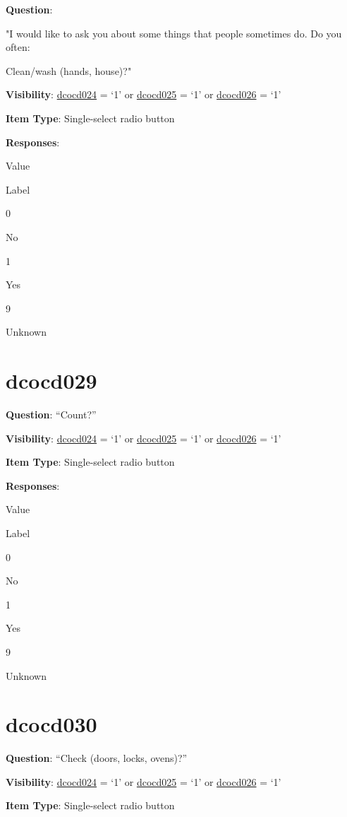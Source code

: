 \documentclass[]{book}
\begin{document}
\textbf{Question}:

"I would like to ask you about some things that people sometimes do. Do you often:

Clean/wash (hands, house)?"

\textbf{Visibility}: \protect\hyperlink{dcocd024}{dcocd024} = `1' or \protect\hyperlink{dcocd025}{dcocd025} = `1' or \protect\hyperlink{dcocd026}{dcocd026} = `1'

\textbf{Item Type}: Single-select radio button

\textbf{Responses}:

Value

Label

0

No

1

Yes

9

Unknown

\hypertarget{dcocd029}{%
\section{dcocd029}\label{dcocd029}}

\textbf{Question}: ``Count?''

\textbf{Visibility}: \protect\hyperlink{dcocd024}{dcocd024} = `1' or \protect\hyperlink{dcocd025}{dcocd025} = `1' or \protect\hyperlink{dcocd026}{dcocd026} = `1'

\textbf{Item Type}: Single-select radio button

\textbf{Responses}:

Value

Label

0

No

1

Yes

9

Unknown

\hypertarget{dcocd030}{%
\section{dcocd030}\label{dcocd030}}

\textbf{Question}: ``Check (doors, locks, ovens)?''

\textbf{Visibility}: \protect\hyperlink{dcocd024}{dcocd024} = `1' or \protect\hyperlink{dcocd025}{dcocd025} = `1' or \protect\hyperlink{dcocd026}{dcocd026} = `1'

\textbf{Item Type}: Single-select radio button
\end{document}
